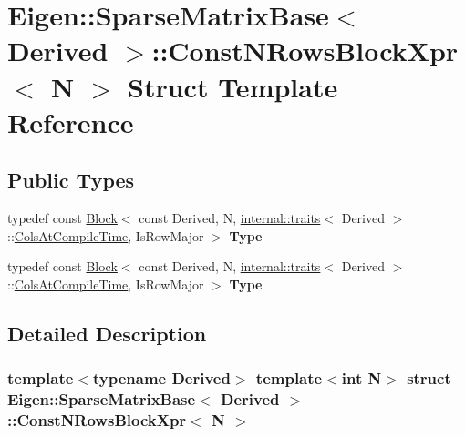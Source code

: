 \hypertarget{struct_eigen_1_1_sparse_matrix_base_1_1_const_n_rows_block_xpr}{}\section{Eigen\+:\+:Sparse\+Matrix\+Base$<$ Derived $>$\+:\+:Const\+N\+Rows\+Block\+Xpr$<$ N $>$ Struct Template Reference}
\label{struct_eigen_1_1_sparse_matrix_base_1_1_const_n_rows_block_xpr}
\subsection*{Public Types}
\begin{DoxyCompactItemize}
\item 
\mbox{\label{struct_eigen_1_1_sparse_matrix_base_1_1_const_n_rows_block_xpr_a2aac4e649b8b3c886614ccd40a7f2b63}} 
typedef const \hyperlink{group___core___module_class_eigen_1_1_block}{Block}$<$ const Derived, N, \hyperlink{struct_eigen_1_1internal_1_1traits}{internal\+::traits}$<$ Derived $>$\+::\hyperlink{group___sparse_core___module_a726a12d2ba40a5f476c247c8f6db39d9abde032f883577b8aaad1c2a29ac3f18c}{Cols\+At\+Compile\+Time}, Is\+Row\+Major $>$ {\bfseries Type}
\item 
\mbox{\label{struct_eigen_1_1_sparse_matrix_base_1_1_const_n_rows_block_xpr_a2aac4e649b8b3c886614ccd40a7f2b63}} 
typedef const \hyperlink{group___core___module_class_eigen_1_1_block}{Block}$<$ const Derived, N, \hyperlink{struct_eigen_1_1internal_1_1traits}{internal\+::traits}$<$ Derived $>$\+::\hyperlink{group___sparse_core___module_a726a12d2ba40a5f476c247c8f6db39d9abde032f883577b8aaad1c2a29ac3f18c}{Cols\+At\+Compile\+Time}, Is\+Row\+Major $>$ {\bfseries Type}
\end{DoxyCompactItemize}


\subsection{Detailed Description}
\subsubsection*{template$<$typename Derived$>$\newline
template$<$int N$>$\newline
struct Eigen\+::\+Sparse\+Matrix\+Base$<$ Derived $>$\+::\+Const\+N\+Rows\+Block\+Xpr$<$ N $>$}



